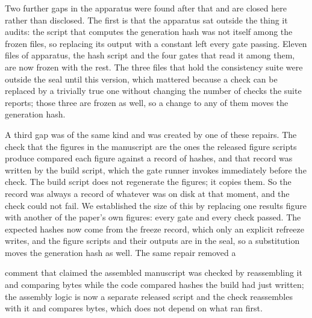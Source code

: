Two further gaps in the apparatus were found after that and are closed here rather than disclosed. The first is that the apparatus sat outside the thing it audits: the script that computes the generation hash was not itself among the frozen files, so replacing its output with a constant left every gate passing. Eleven files of apparatus, the hash script and the four gates that read it among them, are now frozen with the rest. The three files that hold the consistency suite were outside the seal until this version, which mattered because a check can be replaced by a trivially true one without changing the number of checks the suite reports; those three are frozen as well, so a change to any of them moves the generation hash.

A third gap was of the same kind and was created by one of these repairs. The check that the figures in the manuscript are the ones the released figure scripts produce compared each figure against a record of hashes, and that record was written by the build script, which the gate runner invokes immediately before the check. The build script does not regenerate the figures; it copies them. So the record was always a record of whatever was on disk at that moment, and the check could not fail. We established the size of this by replacing one results figure with another of the paper's own figures: every gate and every check passed. The expected hashes now come from the freeze record, which only an explicit refreeze writes, and the figure scripts and their outputs are in the seal, so a substitution moves the generation hash as well. The same repair removed a

comment that claimed the assembled manuscript was checked by reassembling it and comparing bytes while the code compared hashes the build had just written; the assembly logic is now a separate released script and the check reassembles with it and compares bytes, which does not depend on what ran first.

